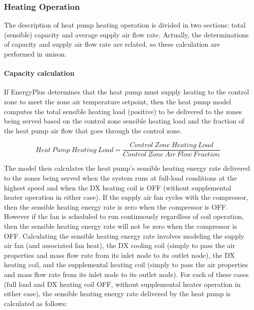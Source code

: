 \subsubsection{Heating Operation}\label{heating-operation-1}

The description of heat pump heating operation is divided in two sections: total (sensible) capacity and average supply air flow rate. Actually, the determinations of capacity and supply air flow rate are related, so these calculation are performed in unison.

\paragraph{Capacity calculation}\label{capacity-calculation-1}

If EnergyPlus determines that the heat pump must supply heating to the control zone to meet the zone air temperature setpoint, then the heat pump model computes the total sensible heating load (positive) to be delivered to the zones being served based on the control zone sensible heating load and the fraction of the heat pump air flow that goes through the control zone.

\begin{equation}
Heat~Pump~Heating~Load = \frac{{Control~Zone~Heating~Load}}{{Control~Zone~Air~Flow~Fraction}}
\end{equation}

The model then calculates the heat pump's sensible heating energy rate delivered to the zones being served when the system runs at full-load conditions at the highest speed and when the DX heating coil is OFF (without supplemental heater operation in either case). If the supply air fan cycles with the compressor, then the sensible heating energy rate is zero when the compressor is OFF. However if the fan is scheduled to run continuously regardless of coil operation, then the sensible heating energy rate will not be zero when the compressor is OFF. Calculating the sensible heating energy rate involves modeling the supply air fan (and associated fan heat), the DX cooling coil (simply to pass the air properties and mass flow rate from its inlet node to its outlet node), the DX heating coil, and the supplemental heating coil (simply to pass the air properties and mass flow rate from its inlet node to its outlet node). For each of these cases (full load and DX heating coil OFF, without supplemental heater operation in either case), the sensible heating energy rate delivered by the heat pump is calculated as follows:

